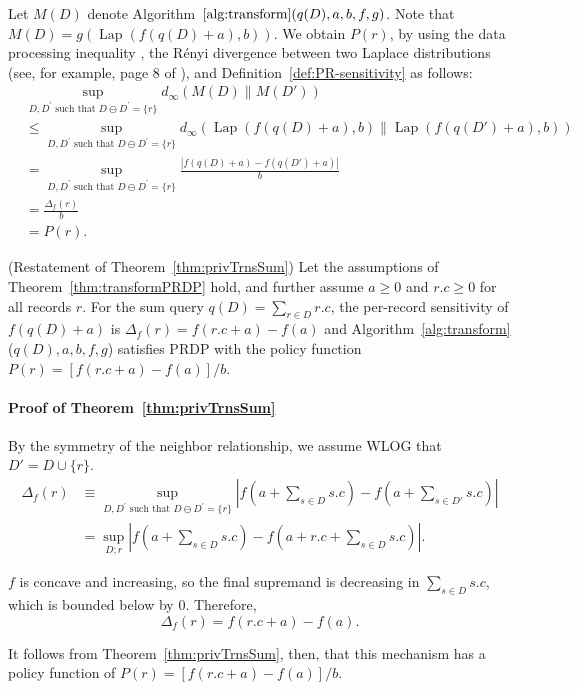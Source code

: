 \documentclass[11pt]{article}
\newcommand{\Lap}{\operatorname{Lap}}
\begin{document}
Let $M(D)$ denote Algorithm~$\ref{alg:transform}\allowbreak(q(D), a, b, f, g)$. Note that $M(D) = g(\Lap(f(q(D) + a), b))$. We obtain $P(r)$, by using the data processing inequality \cite{renyi1961measures}, the R\'enyi divergence between two Laplace distributions (see, for example, page 8 of \cite{Mironov2017RenyiDP}), and Definition~\ref{def:PR-sensitivity} as follows:
    \begin{align}
        &\sup_{D,D^\prime \text{ such that } D \ominus D^\prime = \{r\}} d_\infty \left(M(D) \| M(D') \right) \\
        &\leq \sup_{D,D^\prime \text{ such that } D \ominus D^\prime = \{r\}} d_\infty \left(\Lap(f(q(D) + a), b) \| \Lap(f(q(D') + a), b) \right) \\
        &= \sup_{D,D^\prime \text{ such that } D \ominus D^\prime = \{r\}} \frac{|f(q(D) + a) - f(q(D') + a)|}{b} \\
        &= \frac{\Delta_f(r)}{b} \\
        &= P(r). 
    \end{align}  

\begin{theorem}
(Restatement of Theorem~\ref{thm:privTrnsSum})
Let the assumptions of Theorem~\ref{thm:transformPRDP} hold, and further assume $a \geq 0$ and $r.c \geq 0$ for all records $r$. For the sum query $q(D) = \sum_{r \in D} r.c$, the per-record sensitivity of $f(q(D) + a)$ is $\Delta_f(r) = f(r.c + a) - f(a)$ and Algorithm~\ref{alg:transform}($q(D),a,b,f,g$) satisfies PRDP with the policy function $P(r) = [f(r.c + a) - f(a)]/b$.
\end{theorem}

\paragraph{Proof of Theorem~\ref{thm:privTrnsSum}}

By the symmetry of the neighbor relationship, we assume WLOG that $D' = D \cup \{r\}$.
    \begin{align}
        \Delta_f(r) &\equiv 
        \sup_{D,D^\prime \text{ such that } D \ominus D^\prime = \{r\}} |f(a + \sum_{s \in D} s.c) - f(a + \sum_{s \in D'} s.c)| \\
        &= \sup_{D; r} |f(a + \sum_{s \in D} s.c) - f(a + r.c + \sum_{s \in D} s.c) |.
    \end{align}

    $f$ is concave and increasing, so the final supremand is decreasing in $\sum_{s \in D} s.c$, which is bounded below by 0. Therefore,
    $$\Delta_f(r) = f(r.c + a) - f(a).$$ 

    It follows from Theorem~\ref{thm:privTrnsSum}, then, that this mechanism has a policy function of $P(r) = [f(r.c + a) - f(a)]/b$.




\end{document}
